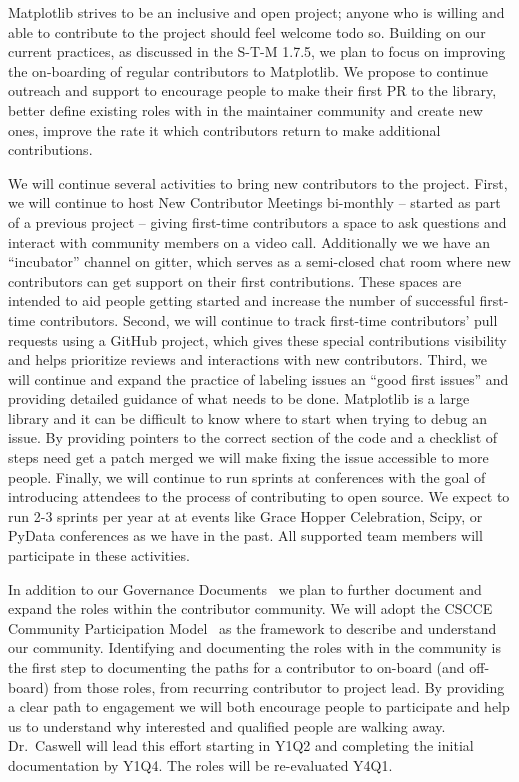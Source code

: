 \documentclass[12pt]{article}
\numberwithin{page}{section}
\begin{document}
Matplotlib strives to be an inclusive and open project; anyone who is willing
and able to contribute to the project should feel welcome todo so.  Building on
our current practices, as discussed in the S-T-M 1.7.5, we plan to focus
on improving the on-boarding of regular contributors to Matplotlib.  We propose
to continue outreach and support to encourage people to make their first PR to
the library, better define existing roles with in the maintainer community and
create new ones, improve the rate it which contributors return to make
additional contributions.

We will continue several activities to bring new contributors to the project.
First, we will continue to host New Contributor Meetings bi-monthly -- started
as part of a previous project -- giving first-time contributors a space to ask
questions and interact with community members on a video call.  Additionally we
we have an ``incubator'' channel on gitter, which serves as a semi-closed chat
room where new contributors can get support on their first contributions.
These spaces are intended to aid people getting started and increase the number
of successful first-time contributors.  Second, we will continue to track
first-time contributors' pull requests using a GitHub project, which gives
these special contributions visibility and helps prioritize reviews and
interactions with new contributors. Third, we will continue and expand the
practice of labeling issues an ``good first issues'' and providing detailed
guidance of what needs to be done.  Matplotlib is a large library and it can be
difficult to know where to start when trying to debug an issue.  By providing
pointers to the correct section of the code and a checklist of steps need get a
patch merged we will make fixing the issue accessible to more people.  Finally,
we will continue to run sprints at conferences with the goal of introducing
attendees to the process of contributing to open source.  We expect to run 2-3
sprints per year at at events like Grace Hopper Celebration, Scipy, or PyData
conferences as we have in the past.  All supported team members will participate
in these activities.

In addition to our Governance Documents~\cite{gov} we plan to further document
and expand the roles within the contributor community.  We will adopt the CSCCE
Community Participation Model~\cite{cscce:cpm} as the framework to describe and
understand our community.  Identifying and documenting the roles with in the
community is the first step to documenting the paths for a contributor to
on-board (and off-board) from those roles, from recurring contributor to
project lead.  By providing a clear path to engagement we will both encourage
people to participate and help us to understand why interested and qualified
people are walking away.  Dr.\ Caswell will lead this effort starting in Y1Q2
and completing the initial documentation by Y1Q4.  The roles will be
re-evaluated Y4Q1.
\end{document}
